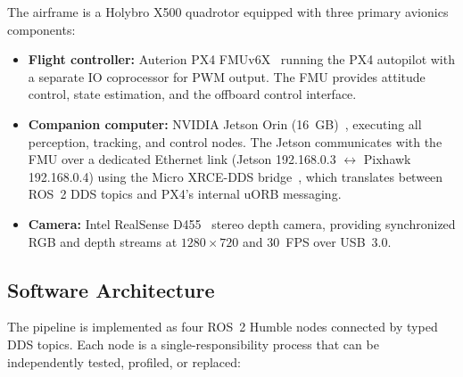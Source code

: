 \documentclass[11pt,letterpaper]{article}
\begin{document}
The airframe is a Holybro X500 quadrotor equipped with three primary
avionics components:
\begin{itemize}
    \item \textbf{Flight controller:} Auterion PX4 FMUv6X~\cite{px4docs} running the PX4 autopilot with a separate IO coprocessor for PWM output.  The FMU provides attitude control, state estimation, and the offboard control interface.
    \item \textbf{Companion computer:} NVIDIA Jetson Orin (16~GB)~\cite{jetsonorin}, executing all perception, tracking, and control nodes.  The Jetson communicates with the FMU over a dedicated Ethernet link (Jetson 192.168.0.3 $\leftrightarrow$ Pixhawk 192.168.0.4) using the Micro XRCE-DDS bridge~\cite{eprosimadds}, which translates between ROS~2 DDS topics and PX4's internal uORB messaging.
    \item \textbf{Camera:} Intel RealSense D455~\cite{realsensed455} stereo depth camera, providing synchronized RGB and depth streams at $1280\times720$ and 30~FPS over USB~3.0.
\end{itemize}

\subsection{Software Architecture}
\label{sec:sw_arch}

The pipeline is implemented as four ROS~2 Humble nodes connected by
typed DDS topics.  Each node is a single-responsibility process that
can be independently tested, profiled, or replaced:
\end{document}
